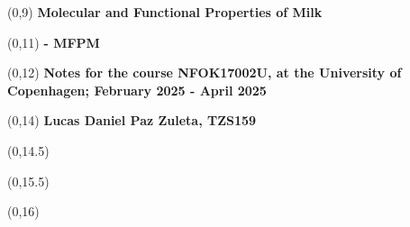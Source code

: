 \begin{titlepage}


\begin{textblock}{9.4}(0,9)
    \Huge{\sffamily\bfseries{Molecular and Functional Properties of Milk}}
\end{textblock}
\begin{textblock}{9.4}(0,11)
    \Huge{\sffamily\bfseries{- MFPM}}
\end{textblock}

\begin{textblock}{9.4}(0,12)
    \LARGE{\sffamily\bfseries{Notes for the course NFOK17002U, at the University of Copenhagen; February 2025 - April 2025}}
\end{textblock}

\begin{textblock}{9.4}(0,14)
    \large{\sffamily\bfseries{Lucas Daniel Paz Zuleta, TZS159}}
\end{textblock}

\begin{textblock}{9.4}(0,14.5)
    \large{}
\end{textblock}

\begin{textblock}{9.4}(0,15.5)
    \large{}
\end{textblock}

\begin{textblock}{8.4}(0,16)
    \large{}
\end{textblock}


\end{titlepage}
